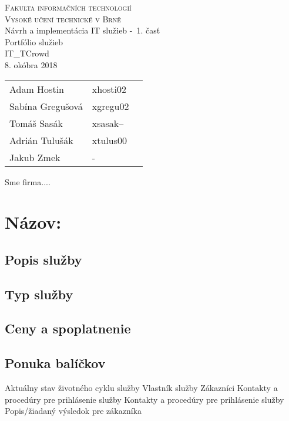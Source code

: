\documentclass[a4paper, 11pt]{article}
\begin{document}
\begin{center}
\Huge
\textsc{Fakulta informačních technologií\\
Vysoké učení technické v Brně}
\\[84mm]
\LARGE Návrh a implementácia IT služieb \--\ 1. časť\\
\Huge Portfólio služieb\\
\vspace{3.5cm}
\LARGE IT\_TCrowd\\
\Large 8. okóbra 2018
\end{center}

\hfill

\begin{minipage}[l]{0.6 \textwidth}
\Large
\begin{tabular}{l l l}
Adam Hostin  & xhosti02\\
Sabína Gregušová & xgregu02\\
Tomáš Sasák & xsasak-- \\
Adrián Tulušák  & xtulus00 \\
Jakub Zmek & \--\ \\
\end{tabular}
\end{minipage}
\thispagestyle{empty}
\clearpage

\setcounter{page}{1}

Sme firma....



\section*{Názov:}
\subsection*{Popis služby}
\subsection*{Typ služby}
\subsection*{Ceny a spoplatnenie}
\subsection*{Ponuka balíčkov}
Aktuálny stav životného cyklu služby
Vlastník služby
Zákazníci
Kontakty a procedúry pre prihlásenie služby
Kontakty a procedúry pre prihlásenie služby
Popis/žiadaný výsledok pre zákazníka
\end{document}

